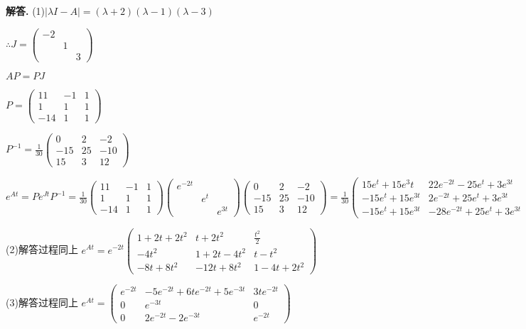 \documentclass[12pt, a4paper, oneside]{ctexart}
\newenvironment{solution}{\par\noindent\textbf{解答. }}{\par}
\begin{document}
\begin{solution}
    (1)$|\lambda I-A|=(\lambda+2)(\lambda-1)(\lambda-3)$

    $\therefore J=\begin{pmatrix}
        -2 & & \\
        & 1 & \\
        & & 3
    \end{pmatrix}$

    $AP=PJ$

    $P=\begin{pmatrix}
        11 & -1 & 1 \\
        1 & 1 & 1 \\
        -14 & 1 & 1
    \end{pmatrix}$

    $P^{-1}=\frac{1}{30}\begin{pmatrix}
        0 & 2 & -2 \\
        -15 & 25 & -10 \\
        15 & 3 & 12
    \end{pmatrix}$

    $e^{At}=Pe^{Jt}P^{-1}=\frac{1}{30}\begin{pmatrix}
        11 & -1 & 1 \\
        1 & 1 & 1 \\
        -14 & 1 & 1
    \end{pmatrix}\begin{pmatrix}
        e^{-2t} & & \\
        & e^{t} & \\
        & & e^{3t}
    \end{pmatrix}
    \begin{pmatrix}
        0 & 2 & -2 \\
        -15 & 25 & -10 \\
        15 & 3 & 12
    \end{pmatrix}
    =\frac{1}{30}
    \begin{pmatrix}
       15e^t+15e^3t & 22e^{-2t}-25e^{t}+3e^{3t} & -22e^{-2t}+10e^{t}+12e^{3t} \\ 
         -15e^t+15e^{3t} & 2e^{-2t}+25e^{t}+3e^{3t} & -2e^{-2t}-10e^{t}+12e^{3t} \\
            -15e^t+15e^{3t} & -28e^{-2t}+25e^{t}+3e^{3t} & 28e^{-2t}-10e^{t}+12e^{3t}
    \end{pmatrix}$

    (2)解答过程同上
    $e^{At}=e^{-2t}\begin{pmatrix}
        1+2t+2t^2 & t+2t^2 & \frac{t^2}{2} \\
        -4t^2 & 1+2t-4t^2 & t-t^2 \\
        -8t+8t^2 & -12t+8t^2 & 1-4t+2t^2
    \end{pmatrix}$

    (3)解答过程同上
    $e^{At}=\begin{pmatrix}
        e^{-2t} & -5e^{-2t}+6te^{-2t}+5e^{-3t} & 3te^{-2t} \\
        0 & e^{-3t} & 0 \\
        0 & 2e^{-2t}-2e^{-3t} & e^{-2t}
    \end{pmatrix}$
\end{solution}
\end{document}
